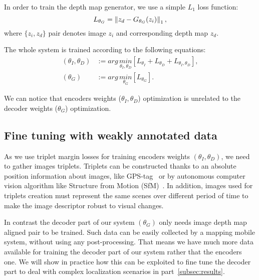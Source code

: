 In order to train the depth map generator, we use a simple $L_1$ loss function:
\begin{equation}
	\label{eq:l1_loss}
	L_{\theta_{G}} = \left\lVert z_d - G_{\theta_{G}}(z_i)\right\rVert_{1},
\end{equation}
where $\{z_i, z_d\}$ pair denotes image $z_i$ and corresponding depth map $z_d$.

The whole system is trained according to the following equations:
\begin{align}
	\label{eq:sys_optimization}
	\left( \theta_{I}, \theta_{D} \right) & := arg\,\underset{\theta_{I}, \theta_{D}}{min} \left[ L_{\theta_{I}} + L_{\theta_{D}} + L_{\theta_{I},\theta_{D}} \right], \\
	\left( \theta_{G} \right) & := arg\,\underset{\theta_{G}}{min} \left[ L_{\theta_{G}} \right]. 
\end{align}

We can notice that encoders weights ($\theta_{I}, \theta_{D}$) optimization is unrelated to the decoder weights ($\theta_{G}$) optimization.

\subsection{Fine tuning with weakly annotated data}
\label{subsec:data}
As we use triplet margin losses for training encoders weights $(\theta_{I}, \theta_{D})$, we need to gather images triplets. Triplets can be constructed thanks to an absolute position information about images, like GPS-tag~\cite{Arandjelovic2017,Liu2018} or by autonomous computer vision algorithm like Structure from Motion (SfM)~\cite{Godard2017,Radenovic2017,Kim2017a}. In addition, images used for triplets creation must represent the same scenes over different period of time to make the image descriptor robust to visual changes.

In contrast the decoder part of our system $(\theta_{G})$ only needs image depth map aligned pair to be trained. Such data can be easily collected by a mapping mobile system, without using any post-processing. That means we have much more data available for training the decoder part of our system rather that the encoders one. We will show in practice how this can be exploited to fine tune the decoder part to deal with complex localization scenarios in part~\ref{subsec:results}.




